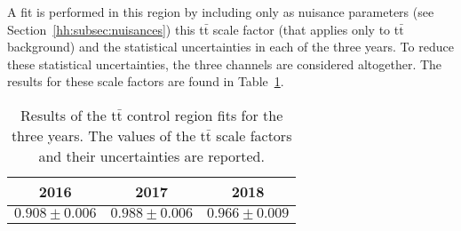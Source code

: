 \documentclass[../main.tex]{subfiles}
\begin{document}
A fit is performed in this region by including only as nuisance parameters (see Section~\ref{hh:subsec:nuisances}) this t$\bar{\text{t}}$ scale factor (that applies only to t$\bar{\text{t}}$ background) and the statistical uncertainties in each of the three years. To reduce these statistical uncertainties, the three channels are considered altogether. The results for these scale factors are found in Table~\ref{hh:tab:ttsf}.

\begin{table}[h!]
\begin{center}
\begin{tabular}{c | c | c}
2016 & 2017 & 2018 \\
\hline
$0.908 \pm 0.006$ &  $0.988 \pm 0.006$ & $0.966 \pm 0.009$
\end{tabular}
\end{center}
\caption{Results of the t$\bar{\text{t}}$ control region fits for the three years. The values of the t$\bar{\text{t}}$ scale factors and their uncertainties are reported.}
\label{hh:tab:ttsf}
\end{table}




%
%
\end{document}

